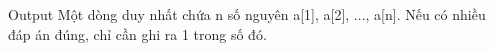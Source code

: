 Output
Một dòng duy nhất chứa n số nguyên a[1], a[2], ..., a[n]. Nếu có nhiều đáp án đúng, chỉ cần ghi ra 1 trong số đó.